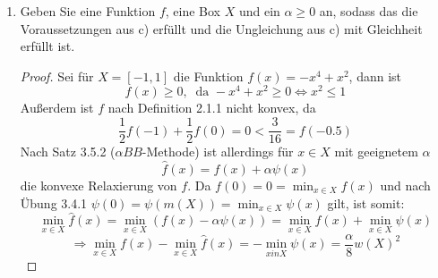 \documentclass[12pt]{extreport} %
\begin{document}
\begin{enumerate}
		$$ v - \hat{v} \leq \frac{\alpha}{8} w(X)^2 $$
		\begin{proof}
			Da die Voraussetzungen von a) und b) gelten und nach Übung 3.4.1 
			$$ \psi(x) \geq \min_{x \in X} \psi(x) = -\frac{1}{8} w(X)^2, $$
			folgt die Behauptung aus b), indem man 
			$$ g(x) \coloneqq \alpha \psi(x) \quad \forall x \in X $$
			setzt, damit nicht $g(x) \geq -2$ sondern $g(x) \geq \alpha \min_{x \in X} \psi(x) = - \frac{\alpha}{8} w(X)^2$, und da nach Satz 3.4.3 folgt, dass $\hat{f} = f + \psi$ eine konvexe Relaxierung von $f$ auf $X$ ist.
		\end{proof}
	\item Geben Sie eine Funktion $f$, eine Box $X$ und ein $\alpha \geq 0$ an, sodass das die Voraussetzungen aus c) erfüllt und die Ungleichung aus c) mit Gleichheit erfüllt ist.
		\begin{proof}
			Sei für $X = [-1, 1]$ die Funktion $f(x) = - x^4 +  x^2$, dann ist 
			$$ f(x) \geq 0, ~\text{ da } - x^4 +  x^2 \geq 0 \iff x^2 \leq 1 $$
			Außerdem ist $f$ nach Definition 2.1.1 nicht konvex, da 
			$$ \frac{1}{2} f(-1) + \frac{1}{2} f(0) = 0 < \frac{3}{16} = f(-0.5) $$
			Nach Satz 3.5.2 ($\alpha BB$-Methode) ist allerdings für $x \in X$ mit geeignetem $\alpha$
			$$ \hat{f}(x) = f(x) + \alpha \psi(x) $$
		 die konvexe Relaxierung von $f$. Da $f(0) = 0 = \min_{x \in X} f(x)$ und nach Übung 3.4.1 $\psi(0) = \psi(m(X)) = \min_{x \in X} \psi(x)$ gilt, ist somit:
			$$ \min_{x \in X} \hat{f}(x) = \min_{x \in X} \left( f(x) - \alpha \psi(x) \right) = \min_{x \in X} f(x) + \min_{x \in X} \psi(x)  $$
			$$ \Rightarrow \min_{x \in X} f(x) - \min_{x \in X} \hat{f}(x) = - \min_{x in X} \psi(x) =  \frac{\alpha}{8} w(X)^2  $$
		\end{proof}
\end{enumerate}
\end{document}
